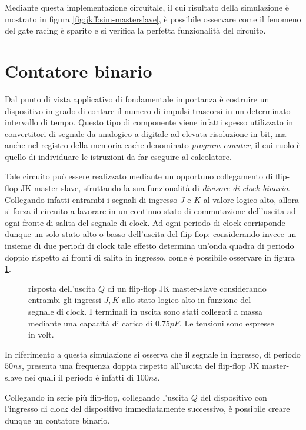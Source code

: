 	Mediante questa implementazione circuitale, il cui risultato della simulazione è mostrato in figura \ref{fig:jkff:sim-masterslave}, è possibile osservare come il fenomeno del gate racing è sparito e si verifica la perfetta funzionalità del circuito.
	
\section{Contatore binario}
	Dal punto di vista applicativo di fondamentale importanza è costruire un dispositivo in grado di contare il numero di impulsi trascorsi in un determinato intervallo di tempo. Questo tipo di componente viene infatti spesso utilizzato in convertitori di segnale da analogico a digitale ad elevata risoluzione in bit, ma anche nel registro della memoria cache denominato \textit{program counter}, il cui ruolo è quello di individuare le istruzioni da far eseguire al calcolatore.
	
	Tale circuito può essere realizzato mediante un opportuno collegamento di flip-flop JK master-slave, sfruttando la sua funzionalità di \textit{divisore di clock binario}. Collegando infatti entrambi i segnali di ingresso $J$ e $K$ al valore logico alto, allora si forza il circuito a lavorare in un continuo stato di commutazione dell'uscita ad ogni fronte di salita del segnale di clock. Ad ogni periodo di clock corrisponde dunque un solo stato alto o basso dell'uscita del flip-flop: considerando invece un insieme di due periodi di clock tale effetto determina un'onda quadra di periodo doppio rispetto ai fronti di salita in ingresso, come è possibile osservare in figura \ref{fig:count:single}.
	
	\begin{figure}[bht]
		\centering
		
		\vspace{3mm}
		\caption{risposta dell'uscita $Q$ di un flip-flop JK master-slave considerando entrambi gli ingressi $J,K$ allo stato logico alto in funzione del segnale di clock. I terminali in uscita sono stati collegati a massa mediante una capacità di carico di $0.75pF$. Le tensioni sono espresse in volt.}
		\label{fig:count:single}
	\end{figure}
	
	In riferimento a questa simulazione si osserva che il segnale in ingresso, di periodo $50ns$, presenta una frequenza doppia rispetto all'uscita del flip-flop JK master-slave nei quali il periodo è infatti di $100ns$.
	
	Collegando in serie più flip-flop, collegando l'uscita $Q$ del dispositivo con l'ingresso di clock del dispositivo immediatamente successivo, è possibile creare dunque un contatore binario.
	
